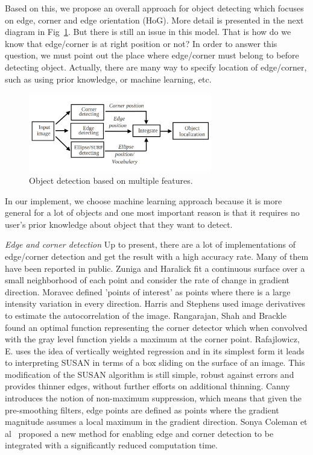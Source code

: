 Based on this, we propose an overall approach for object detecting
which focuses on edge, corner and edge orientation (HoG). More
detail is presented in the next diagram in Fig~\ref{fig:framework}. But there is still an
issue in this model. That is how do we know that edge/corner is at
right position or not? In order to answer this question, we must point
out the place where edge/corner must belong to before detecting
object. Actually, there are many way to specify location of
edge/corner, such as using prior knowledge, or machine learning, etc.
\begin{figure}[ht]
  \centering
  \includegraphics[width=3.15in]{images/framework1.jpg}
  \caption{Object detection based on multiple features.}
  \label{fig:framework}
\end{figure}
In our implement, we choose machine learning approach because
it is more general for a lot of objects and one most
important reason is that it requires no user's prior knowledge about object that they want to detect.

\textit{Edge and corner detection }
Up to present, there are a lot of implementations of edge/corner
detection and get the result with a high accuracy rate. Many of them
have been reported in public. Zuniga and Haralick fit a continuous
surface over a small neighborhood of each point and consider the
rate of change in gradient direction. Moravec defined 'points of interest' as points where there is a 
large intensity variation in every direction. Harris and Stephens used image derivatives to estimate the
autocorrelation of the image. Rangarajan, Shah and Brackle found an
optimal function representing the corner detector which when
convolved with the gray level function yields a maximum at the
corner point. Rafajlowicz, E. uses the idea of vertically weighted
regression and in its simplest form it leads to interpreting SUSAN in
terms of a box sliding on the surface of an image. This modification
of the SUSAN algorithm is still simple, robust against errors and
provides thinner edges, without further efforts on additional thinning.
Canny introduces the notion of non-maximum suppression, which
means that given the pre-smoothing filters, edge points are defined
as points where the gradient magnitude assumes a local maximum in
the gradient direction. Sonya Coleman et al~\cite{coleman2007integrated}
proposed a new method for enabling edge and corner detection to be
integrated with a significantly reduced computation time.


